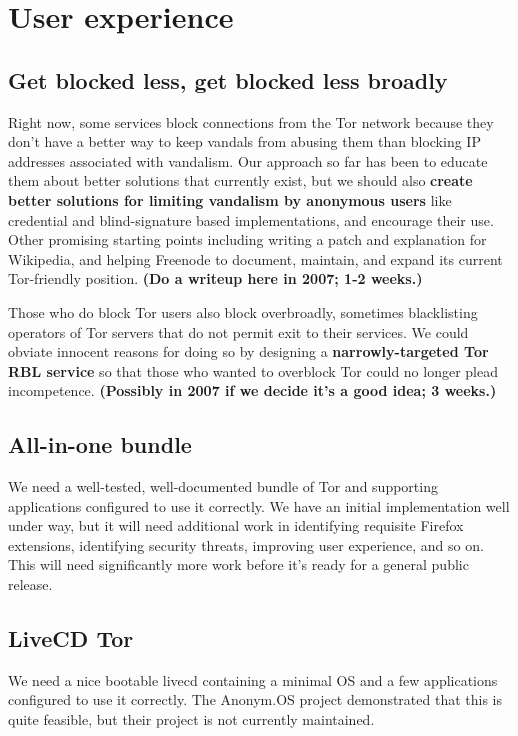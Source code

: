 \documentclass{article}
\newcommand{\plan}[1]{ {\bf (#1)}}
\begin{document}
\section{User experience}

\subsection{Get blocked less, get blocked less broadly}
Right now, some services block connections from the Tor network because
they don't have a better
way to keep vandals from abusing them than blocking IP addresses associated
with vandalism.  Our approach so far has been to educate them about better
solutions that currently exist, but we should also {\bf create better
solutions for limiting vandalism by anonymous users} like credential and
blind-signature based implementations, and encourage their use. Other
promising starting points including writing a patch and explanation for
Wikipedia, and helping Freenode to document, maintain, and expand its
current Tor-friendly position.\plan{Do a writeup here in 2007; 1-2 weeks.}

Those who do block Tor users also block overbroadly, sometimes blacklisting
operators of Tor servers that do not permit exit to their services.  We could
obviate innocent reasons for doing so by designing a {\bf narrowly-targeted Tor
  RBL service} so that those who wanted to overblock Tor could no longer
plead incompetence.\plan{Possibly in 2007 if we decide it's a good idea; 3
  weeks.}

\subsection{All-in-one bundle}
We need a well-tested, well-documented bundle of Tor and supporting
applications configured to use it correctly.  We have an initial
implementation well under way, but it will need additional work in
identifying requisite Firefox extensions, identifying security threats,
improving user experience, and so on.  This will need significantly more work
before it's ready for a general public release.

\subsection{LiveCD Tor}
We need a nice bootable livecd containing a minimal OS and a few applications
configured to use it correctly.  The Anonym.OS project demonstrated that this
is quite feasible, but their project is not currently maintained.
\end{document}
